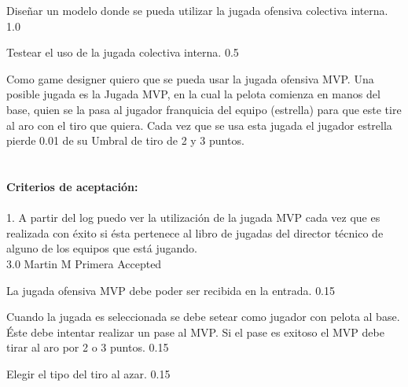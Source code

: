 		{Diseñar un modelo donde se pueda utilizar la jugada ofensiva colectiva interna.} %
		{} %
		{1.0} %
		{} %
		{} %
		{} %

		{Testear el uso de la jugada colectiva interna.} %
		{} %
		{0.5} %
		{} %
		{} %
		{} %

\vspace{20pt}


	{Como game designer quiero que se pueda usar la jugada ofensiva MVP.} %
	{Una posible jugada es la Jugada MVP, en la cual la pelota comienza en manos del base, quien se la pasa al jugador franquicia del equipo (estrella) para que este tire al aro con el tiro que quiera. Cada vez que se usa esta jugada el jugador estrella pierde 0.01 de su Umbral de tiro de 2 y 3 puntos. \\
  \\
  \\
\textbf{Criterios de aceptación:}\\
  \\
1. A partir del log puedo ver la utilización de la jugada MVP cada vez que es realizada con éxito si ésta pertenece al libro de jugadas del director técnico de alguno de los equipos que está jugando. \\
} %
	{} %
	{3.0} %
	{Martin M} %
	{Primera} %
	{Accepted} %

		{La jugada ofensiva MVP debe poder ser recibida en la entrada.} %
		{} %
		{0.15} %
		{} %
		{} %
		{} %

		{Cuando la jugada es seleccionada se debe setear como jugador con pelota al base. Éste debe intentar realizar un pase al MVP. Si el pase es exitoso el MVP debe tirar al aro por 2 o 3 puntos.} %
		{} %
		{0.15} %
		{} %
		{} %
		{} %

		{Elegir el tipo del tiro al azar.} %
		{} %
		{0.15} %
		{} %
		{} %
		{} %
		
